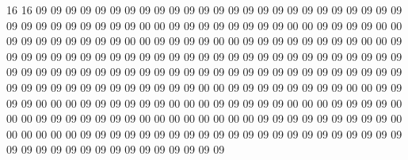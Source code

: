16 16
09 09 09 09 09 09 09 09 09 09 09 09 09 09 09 09
09 09 09 09 09 09 09 09 09 09 09 09 09 09 09 09
09 09 00 00 09 09 09 09 09 09 09 09 00 00 09 09
09 09 00 00 09 09 09 09 09 09 09 09 00 00 09 09
09 09 00 00 09 09 09 09 09 09 09 09 00 00 09 09
09 09 09 09 09 09 09 09 09 09 09 09 09 09 09 09
09 09 09 09 09 09 09 09 09 09 09 09 09 09 09 09
09 09 09 09 09 09 09 09 09 09 09 09 09 09 09 09
09 09 09 09 09 09 09 09 09 09 09 09 09 09 09 09
09 09 00 00 09 09 09 09 09 09 09 09 00 00 09 09
09 09 00 00 00 09 09 09 09 09 09 00 00 00 09 09
09 09 09 00 00 00 09 09 09 09 00 00 00 09 09 09
09 09 09 09 00 00 00 00 00 00 00 00 09 09 09 09
09 09 09 09 09 00 00 00 00 00 00 09 09 09 09 09
09 09 09 09 09 09 09 09 09 09 09 09 09 09 09 09
09 09 09 09 09 09 09 09 09 09 09 09 09 09 09 09